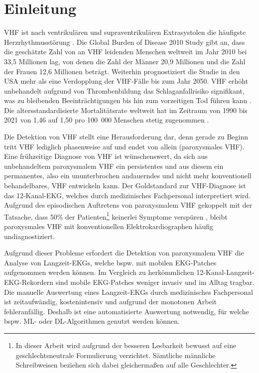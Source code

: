 \chapter{Einleitung}\label{chap:Einleitung}



\gls{VHF} ist nach ventrikulären und supraventrikulären Extrasystolen die häufigste Herzrhythmusstörung \cite{gertsch_ekg_2007}. Die Global Burden of Disease 2010 Study \cite{chugh_worldwide_2014} gibt an, dass die geschätzte Zahl von an \gls{VHF} leidenden Menschen weltweit im Jahr 2010 bei 33,5 Millionen lag, von denen die Zahl der Männer 20,9 Millionen und die Zahl der Frauen 12,6 Millionen beträgt. Weiterhin prognostiziert die Studie in den USA mehr als eine Verdopplung der \gls{VHF}-Fälle bis zum Jahr 2050. \gls{VHF} erhöht unbehandelt aufgrund von Thrombenbildung das Schlaganfallrisiko signifikant, was zu bleibenden Beeinträchtigungen bis hin zum vorzeitigen Tod führen kann \cite{gertsch_ekg_2007}. Die altersstandardisierte Mortalitätsrate weltweit hat im Zeitraum von 1990 bis 2021 von 1,46 auf 1,50 pro 100~000 Menschen stetig zugenommen \cite{liang_global_2025}.

Die Detektion von \gls{VHF} stellt eine Herausforderung dar, denn gerade zu Beginn tritt \gls{VHF} lediglich phasenweise auf und endet von allein (paroxysmales \gls{VHF}). Eine frühzeitige Diagnose von \gls{VHF} ist wünschenswert, da sich aus unbehandeltem paroxysmalem \gls{VHF} ein persistentes und aus diesem ein permanentes, also ein ununterbrochen andauerndes und nicht mehr konventionell behandelbares, \gls{VHF} entwickeln kann. Der Goldstandard zur \gls{VHF}-Diagnose ist das 12-Kanal-\gls{EKG}, welches durch medizinisches Fachpersonal interpretiert wird. Aufgrund des episodischen Auftretens von paroxysmalem \gls{VHF} gekoppelt mit der Tatsache, dass 50\% der Patienten\footnote{In dieser Arbeit wird aufgrund der besseren Lesbarkeit bewusst auf eine geschlechtsneutrale
Formulierung verzichtet. Sämtliche männliche Schreibweisen beziehen sich dabei gleichermaßen
auf alle Geschlechter.} keinerlei Symptome verspüren \cite{gertsch_ekg_2007}, bleibt paroxysmales \gls{VHF} mit konventionellen Elektrokardiographen häufig undiagnostiziert. 
\cite{rizwan_review_2021} 

Aufgrund dieser Probleme erfordert die Detektion von paroxysmalem \gls{VHF} die Analyse von Langzeit-\gls{EKG}s, welche bspw. mit mobilen \gls{EKG}-Patches aufgenommen werden können. Im Vergleich zu herkömmlichen 12-Kanal-Langzeit-\gls{EKG}-Rekordern sind mobile \gls{EKG}-Patches weniger invasiv und im Alltag tragbar. Die manuelle Auswertung eines Langzeit-\gls{EKG}s durch medizinisches Fachpersonal ist zeitaufwändig, kostenintensiv und aufgrund der monotonen Arbeit fehleranfällig. Deshalb ist eine automatisierte Auswertung notwendig, für welche bspw. \gls{ML}- oder \gls{DL}-Algorithmen genutzt werden können. 

